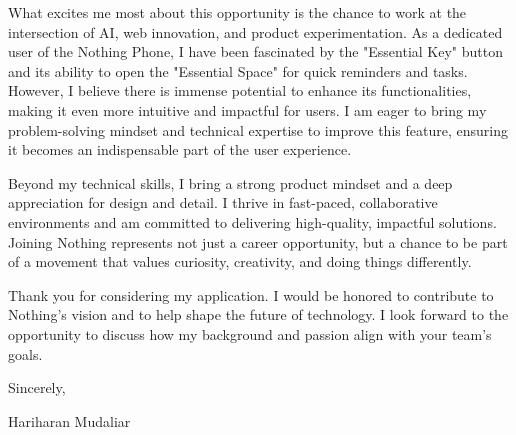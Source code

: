 \documentclass[letterpaper,11pt]{article}
\begin{document}
What excites me most about this opportunity is the chance to work at the intersection of AI, web innovation, and product experimentation. As a dedicated user of the Nothing Phone, I have been fascinated by the "Essential Key" button and its ability to open the "Essential Space" for quick reminders and tasks. However, I believe there is immense potential to enhance its functionalities, making it even more intuitive and impactful for users. I am eager to bring my problem-solving mindset and technical expertise to improve this feature, ensuring it becomes an indispensable part of the user experience.

Beyond my technical skills, I bring a strong product mindset and a deep appreciation for design and detail. I thrive in fast-paced, collaborative environments and am committed to delivering high-quality, impactful solutions. Joining Nothing represents not just a career opportunity, but a chance to be part of a movement that values curiosity, creativity, and doing things differently.

Thank you for considering my application. I would be honored to contribute to Nothing’s vision and to help shape the future of technology. I look forward to the opportunity to discuss how my background and passion align with your team’s goals.

\vspace{10pt}

\noindent Sincerely,

\vspace{20pt}

\noindent Hariharan Mudaliar
\end{document}
